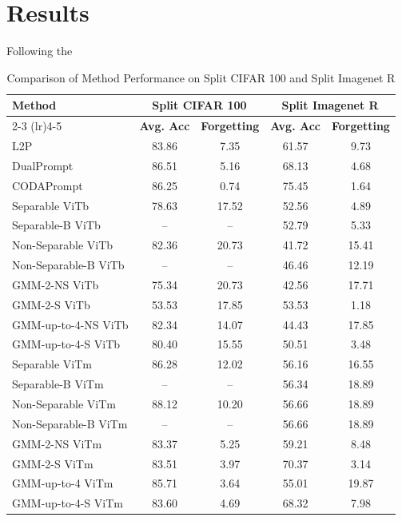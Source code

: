 \chapter{Results} \label{results}

Following the 

\begin{table}[h]
	\centering
	\caption{Comparison of Method Performance on Split CIFAR 100 and Split Imagenet R}
	\label{tab:method_comparison}
	\begin{tabular}{lcccc}
		\toprule
		\multirow{2}{*}{\textbf{Method}} & \multicolumn{2}{c}{\textbf{Split CIFAR 100}} & \multicolumn{2}{c}{\textbf{Split Imagenet R}} \\
		\cmidrule(lr){2-3} \cmidrule(lr){4-5}
		& \textbf{Avg. Acc} & \textbf{Forgetting} & \textbf{Avg. Acc} & \textbf{Forgetting} \\
		\midrule
		L2P & 83.86 & 7.35 & 61.57 & 9.73 \\
		DualPrompt & 86.51 & 5.16 & 68.13 & 4.68 \\
		CODAPrompt & 86.25 & 0.74 & 75.45 & 1.64 \\
		\midrule
		Separable ViTb & 78.63 & 17.52 & 52.56 & 4.89 \\
		Separable-B ViTb & -- & -- & 52.79 & 5.33 \\
		Non-Separable ViTb & 82.36 & 20.73 & 41.72 & 15.41 \\
		Non-Separable-B ViTb & -- & -- & 46.46 & 12.19 \\
		GMM-2-NS ViTb & 75.34 & 20.73 & 42.56 & 17.71 \\
		GMM-2-S ViTb & 53.53 & 17.85 & 53.53 & 1.18 \\
		GMM-up-to-4-NS ViTb & 82.34 & 14.07 & 44.43 & 17.85 \\
		GMM-up-to-4-S ViTb & 80.40 & 15.55 & 50.51 & 3.48 \\
		\midrule
		Separable ViTm & 86.28 & 12.02 & 56.16 & 16.55 \\
		Separable-B ViTm & -- & -- & 56.34 & 18.89 \\
		Non-Separable ViTm & 88.12 & 10.20 & 56.66 & 18.89 \\
		Non-Separable-B ViTm & -- & -- & 56.66 & 18.89 \\
		GMM-2-NS ViTm & 83.37 & 5.25 & 59.21 & 8.48 \\
		GMM-2-S ViTm & 83.51 & 3.97 & 70.37 & 3.14 \\
		GMM-up-to-4 ViTm & 85.71 & 3.64 & 55.01 & 19.87 \\
		GMM-up-to-4-S ViTm & 83.60 & 4.69 & 68.32 & 7.98 \\
		\bottomrule
	\end{tabular}
\end{table}

